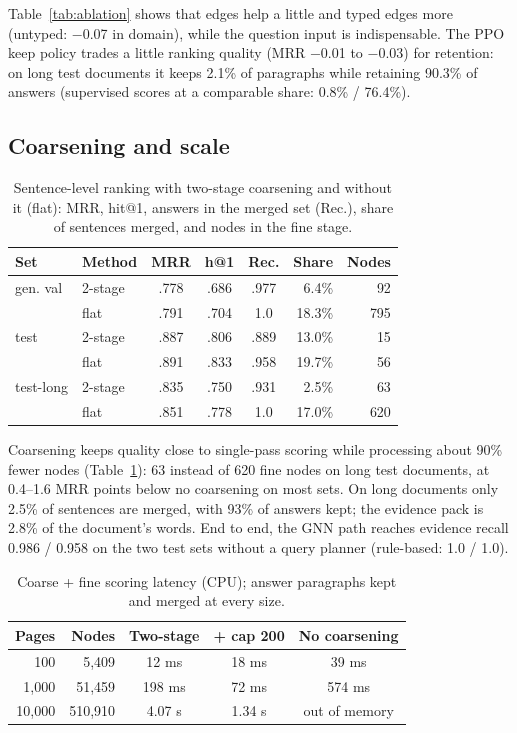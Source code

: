 \documentclass[11pt]{article}
\begin{document}
Table~\ref{tab:ablation} shows that edges help a little and typed edges more (untyped: $-$0.07 in domain), while the question input is indispensable. The PPO keep policy trades a little ranking quality (MRR $-$0.01 to $-$0.03) for retention: on long test documents it keeps 2.1\% of paragraphs while retaining 90.3\% of answers (supervised scores at a comparable share: 0.8\% / 76.4\%).

\subsection{Coarsening and scale}

\begin{table}[t]
\centering
\scriptsize
\setlength{\tabcolsep}{2.5pt}
\begin{tabular}{@{}llcccrr@{}}
\toprule
\textbf{Set} & \textbf{Method} & \textbf{MRR} & \textbf{h@1} & \textbf{Rec.} & \textbf{Share} & \textbf{Nodes} \\
\midrule
gen. val & 2-stage & .778 & .686 & .977 & 6.4\% & 92 \\
 & flat & .791 & .704 & 1.0 & 18.3\% & 795 \\
test & 2-stage & .887 & .806 & .889 & 13.0\% & 15 \\
 & flat & .891 & .833 & .958 & 19.7\% & 56 \\
test-long & 2-stage & .835 & .750 & .931 & 2.5\% & 63 \\
 & flat & .851 & .778 & 1.0 & 17.0\% & 620 \\
\bottomrule
\end{tabular}
\caption{Sentence-level ranking with two-stage coarsening and without it (flat): MRR, hit@1, answers in the merged set (Rec.), share of sentences merged, and nodes in the fine stage.}
\label{tab:coarsening}
\end{table}

Coarsening keeps quality close to single-pass scoring while processing about 90\% fewer nodes (Table~\ref{tab:coarsening}): 63 instead of 620 fine nodes on long test documents, at 0.4--1.6 MRR points below no coarsening on most sets. On long documents only 2.5\% of sentences are merged, with 93\% of answers kept; the evidence pack is 2.8\% of the document's words. End to end, the GNN path reaches evidence recall 0.986 / 0.958 on the two test sets without a query planner (rule-based: 1.0 / 1.0).

\begin{table}[t]
\centering
\scriptsize
\begin{tabular}{@{}rrccc@{}}
\toprule
\textbf{Pages} & \textbf{Nodes} & \textbf{Two-stage} & \textbf{+ cap 200} & \textbf{No coarsening} \\
\midrule
100 & 5,409 & 12 ms & 18 ms & 39 ms \\
1,000 & 51,459 & 198 ms & 72 ms & 574 ms \\
10,000 & 510,910 & 4.07 s & 1.34 s & out of memory \\
\bottomrule
\end{tabular}
\caption{Coarse + fine scoring latency (CPU); answer paragraphs kept and merged at every size.}
\label{tab:scale}
\end{table}
\end{document}

